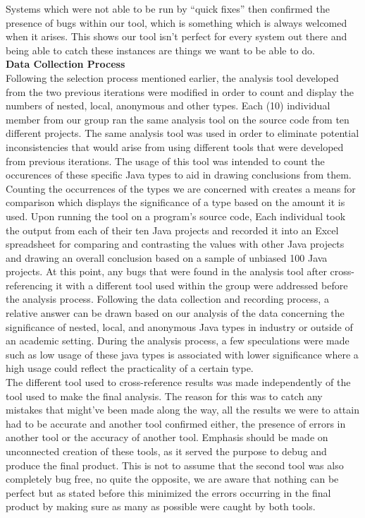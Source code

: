 \documentclass{assignment}
\begin{document}
Systems which were not able to be run by “quick fixes” then confirmed the presence of bugs within our tool, which is something which is always welcomed when it arises. This shows our tool isn’t perfect for every system out there and being able to catch these instances are things we want to be able to do.\\ 

\textbf{Data Collection Process}\\

Following the selection process mentioned earlier, the analysis tool developed from the two previous iterations were modified in order to count and display the numbers of nested, local, anonymous and other types. Each (10)  individual member from our group ran the same analysis tool on the source code from ten different projects. The same analysis tool was used in order to eliminate potential inconsistencies that would arise from using different tools that were developed from previous iterations. The usage of this tool was intended to count the occurences of these specific Java types to aid in drawing conclusions from them. Counting the occurrences of the types we are concerned with creates a means for comparison which displays the significance of a type based on the amount it is used. Upon running the tool on a program’s source code, Each individual took the output from each of their ten Java projects and recorded it into an Excel spreadsheet for comparing and contrasting the values with other Java projects and drawing an overall conclusion based on a sample of unbiased 100 Java projects. At this point, any bugs that were found in the analysis tool after cross-referencing it with a different tool used within the group were addressed before the analysis process. Following the data collection and recording process, a relative answer can be drawn based on our analysis of the data concerning the significance of nested, local, and anonymous Java types in industry or outside of an academic setting. During the analysis process, a few speculations were made such as low usage of these java types is associated with lower significance where a high usage could reflect the practicality of a certain type.\\

The different tool used to cross-reference results was made independently of the tool used to make the final analysis. The reason for this was to catch any mistakes that might’ve been made along the way, all the results we were to attain had to be accurate and another tool confirmed either, the presence of errors in another tool or the accuracy of another tool. Emphasis should be made on unconnected creation of these tools, as it served the purpose to debug and produce the final product. This is not to assume that the second tool was also completely bug free, no quite the opposite, we are aware that nothing can be perfect but as stated before this minimized the errors occurring in the final product by making sure as many as possible were caught by both tools.\\
\end{document}
